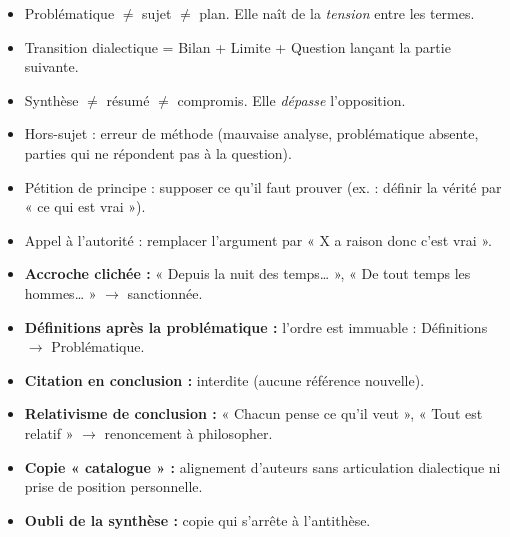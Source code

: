 \documentclass[11pt]{article}
\newcommand{\cle}[1]{{\popxbold\color{popdark}#1}}
\begin{document}
\begin{aretenir}
\begin{itemize}
\item \cle{Problématique} $\neq$ sujet $\neq$ plan. Elle naît de la \emph{tension} entre les termes.
\item \cle{Transition dialectique} = Bilan + Limite + Question lançant la partie suivante.
\item \cle{Synthèse} $\neq$ résumé $\neq$ compromis. Elle \emph{dépasse} l'opposition.
\item \cle{Hors-sujet} : erreur de méthode (mauvaise analyse, problématique absente, parties qui ne répondent pas à la question).
\item \cle{Pétition de principe} : supposer ce qu'il faut prouver (ex. : définir la vérité par « ce qui est vrai »).
\item \cle{Appel à l'autorité} : remplacer l'argument par « X a raison donc c'est vrai ».
\end{itemize}
\end{aretenir}

\begin{attention}
\begin{itemize}
\item \textbf{Accroche clichée :} « Depuis la nuit des temps… », « De tout temps les hommes… » $\rightarrow$ sanctionnée.
\item \textbf{Définitions après la problématique :} l'ordre est immuable : Définitions $\rightarrow$ Problématique.
\item \textbf{Citation en conclusion :} interdite (aucune référence nouvelle).
\item \textbf{Relativisme de conclusion :} « Chacun pense ce qu'il veut », « Tout est relatif » $\rightarrow$ renoncement à philosopher.
\item \textbf{Copie « catalogue » :} alignement d'auteurs sans articulation dialectique ni prise de position personnelle.
\item \textbf{Oubli de la synthèse :} copie qui s'arrête à l'antithèse.
\end{itemize}
\end{attention}
\end{document}
